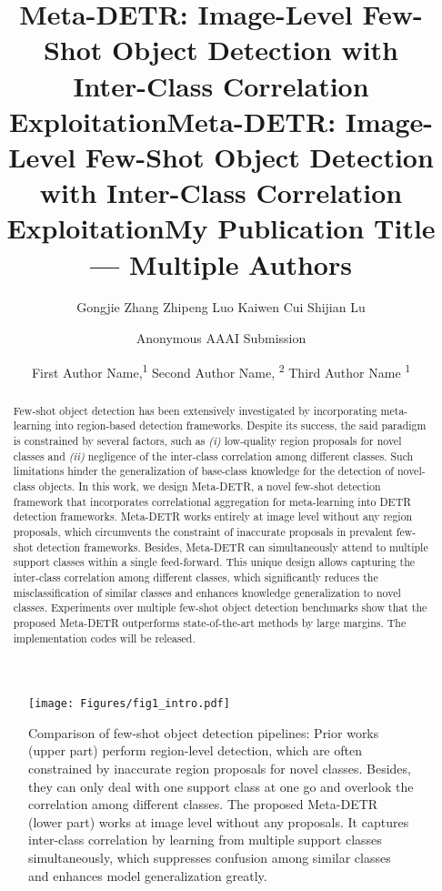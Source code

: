 \documentclass[letterpaper]{article} \usepackage{aaai22}  \usepackage{times}  \usepackage{helvet}  \usepackage{courier}  \usepackage[hyphens]{url}  \usepackage{graphicx} \urlstyle{rm} \def\UrlFont{\rm}  \usepackage{natbib}  \usepackage{caption} \DeclareCaptionStyle{ruled}{labelfont=normalfont,labelsep=colon,strut=off} \frenchspacing  \setlength{\pdfpagewidth}{8.5in}  \setlength{\pdfpageheight}{11in}  \usepackage{algorithm}
\title{Meta-DETR: Image-Level Few-Shot Object Detection with \\ Inter-Class Correlation Exploitation}
\author{
    {\fontsize{10.0}{1cm}\selectfont  Gongjie Zhang \qquad Zhipeng Luo \qquad Kaiwen Cui \qquad Shijian Lu}
}
\title{Meta-DETR: Image-Level Few-Shot Object Detection with Inter-Class Correlation Exploitation}
\author {
    Anonymous AAAI Submission
}
\title{My Publication Title --- Multiple Authors}
\author {
First Author Name,\textsuperscript{\rm 1}
    Second Author Name, \textsuperscript{\rm 2}
    Third Author Name \textsuperscript{\rm 1}
}
\begin{document}
\maketitle



\begin{abstract}

Few-shot object detection has been extensively investigated by incorporating meta-learning into region-based detection frameworks. Despite its success, the said paradigm is constrained by several factors, such as \textit{(i)} low-quality region proposals for novel classes and \textit{(ii)} negligence of the inter-class correlation among different classes. Such limitations hinder the generalization of base-class knowledge for the detection of novel-class objects. In this work, we design Meta-DETR, a novel few-shot detection framework that incorporates correlational aggregation for meta-learning into DETR detection frameworks. Meta-DETR works entirely at image level without any region proposals, which circumvents the constraint of inaccurate proposals in prevalent few-shot detection frameworks. Besides, Meta-DETR can simultaneously attend to multiple support classes within a single feed-forward. This unique design allows capturing the inter-class correlation among different classes, which significantly reduces the misclassification of similar classes and enhances knowledge generalization to novel classes. Experiments over multiple few-shot object detection benchmarks show that the proposed Meta-DETR outperforms state-of-the-art methods by large margins. The implementation codes will be released.

\end{abstract}


\begin{figure}[t!] 
\begin{center}
   \texttt{[image: Figures/fig1\_intro.pdf]}
\end{center}
\vspace*{-2.66mm}
\caption{
Comparison of few-shot object detection pipelines: Prior works (upper part) perform region-level detection, which are often constrained by inaccurate region proposals for novel classes. Besides, they can only deal with one support class at one go and overlook the correlation among different classes. The proposed Meta-DETR (lower part) works at image level without any proposals. It captures inter-class correlation by learning from multiple support classes simultaneously, which suppresses confusion among similar classes and enhances model generalization greatly.
}
\label{fig:fig1}
\vspace*{-1.5mm}
\end{figure}
\end{document}
